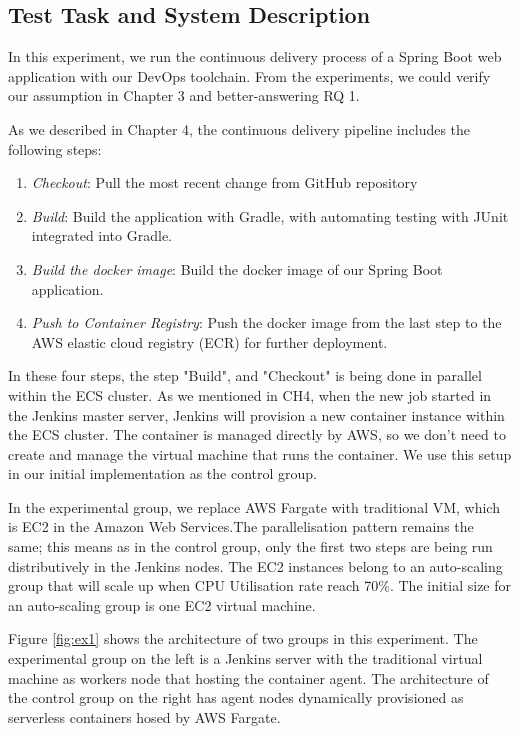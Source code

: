 \subsection{Test Task and System Description}
In this experiment, we run the continuous delivery process of a Spring Boot web application with our DevOps toolchain. From the experiments, we could verify our assumption in Chapter 3 and better-answering RQ 1.
\par
As we described in Chapter 4, the continuous delivery pipeline includes the following steps:
\begin{enumerate}
\item \textit{Checkout}: Pull the most recent change from GitHub repository
\item \textit{Build}: Build the application with Gradle, with automating testing with JUnit integrated into Gradle.
\item \textit{Build the docker image}: Build the docker image of our Spring Boot application.
\item \textit{Push to Container Registry}: Push the docker image from the last step to the AWS elastic cloud registry (ECR) for further deployment.
\end{enumerate}
\par
In these four steps, the step "Build", and "Checkout" is being done in parallel within the ECS cluster. As we mentioned in CH4, when the new job started in the Jenkins master server, Jenkins will provision a new container instance within the ECS cluster. The container is managed directly by AWS, so we don't need to create and manage the virtual machine that runs the container. We use this setup in our initial implementation as the control group.
\par
In the experimental group, we replace AWS Fargate with traditional VM, which is EC2 in the Amazon Web Services.The parallelisation pattern remains the same; this means as in the control group, only the first two steps are being run distributively in the Jenkins nodes. The EC2 instances belong to an auto-scaling group that will scale up when CPU Utilisation rate reach 70\%. The initial size for an auto-scaling group is one EC2 virtual machine.
\par
Figure \ref{fig:ex1} shows the architecture of two groups in this experiment. The experimental group on the left is a Jenkins server with the traditional virtual machine as workers node that hosting the container agent. The architecture of the control group on the right has agent nodes dynamically provisioned as serverless containers hosed by AWS Fargate.
